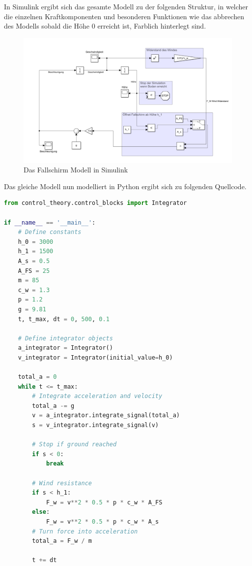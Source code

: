 \documentclass[]{iat}
\begin{document}
In Simulink ergibt sich das gesamte Modell zu der folgenden Struktur, in welcher die einzelnen Kraftkomponenten und besonderen Funktionen wie das abbrechen des Modells sobald die Höhe 0 erreicht ist, Farblich hinterlegt sind.

\begin{figure}[H]
    \includegraphics[width=\textwidth]{graphics/parachute_simulink.png}
    \centering
    \caption{Das Fallschirm Modell in Simulink}
    \label{abb:parachute_simulink}
\end{figure}

Das gleiche Modell nun modelliert in Python ergibt sich zu folgenden Quellcode.

\begin{lstlisting}[language=Python]
from control_theory.control_blocks import Integrator

if __name__ == '__main__':
    # Define constants
    h_0 = 3000
    h_1 = 1500
    A_s = 0.5
    A_FS = 25
    m = 85
    c_w = 1.3
    p = 1.2
    g = 9.81
    t, t_max, dt = 0, 500, 0.1

    # Define integrator objects
    a_integrator = Integrator()
    v_integrator = Integrator(initial_value=h_0)

    total_a = 0
    while t <= t_max:
        # Integrate acceleration and velocity
        total_a -= g
        v = a_integrator.integrate_signal(total_a)
        s = v_integrator.integrate_signal(v)

        # Stop if ground reached
        if s < 0:
            break

        # Wind resistance
        if s < h_1:
            F_w = v**2 * 0.5 * p * c_w * A_FS
        else:
            F_w = v**2 * 0.5 * p * c_w * A_s
        # Turn force into acceleration
        total_a = F_w / m

        t += dt

\end{lstlisting}
\end{document}
